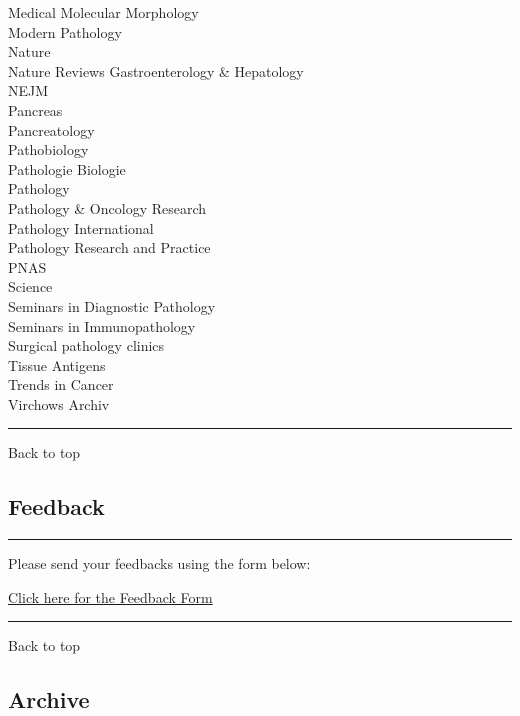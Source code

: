 \documentclass[]{article}
\begin{document}
Medical Molecular Morphology\\
Modern Pathology\\
Nature\\
Nature Reviews Gastroenterology \& Hepatology\\
NEJM\\
Pancreas\\
Pancreatology\\
Pathobiology\\
Pathologie Biologie\\
Pathology\\
Pathology \& Oncology Research\\
Pathology International\\
Pathology Research and Practice\\
PNAS\\
Science\\
Seminars in Diagnostic Pathology\\
Seminars in Immunopathology\\
Surgical pathology clinics\\
Tissue Antigens\\
Trends in Cancer\\
Virchows Archiv

\begin{center}\rule{0.5\linewidth}{\linethickness}\end{center}

Back to top

\pagebreak

\hypertarget{feedback}{%
\subsection{Feedback}\label{feedback}}

\begin{center}\rule{0.5\linewidth}{\linethickness}\end{center}

Please send your feedbacks using the form below:

\href{https://docs.google.com/forms/d/e/1FAIpQLSeD3Z9J6Y7eMmiyM12f_SfAmHUlykb1zxZcwO6lg7cebGYQIQ/viewform}{Click
here for the Feedback Form}

\begin{center}\rule{0.5\linewidth}{\linethickness}\end{center}

Back to top

\pagebreak

\hypertarget{archive}{%
\subsection{Archive}\label{archive}}
\end{document}
